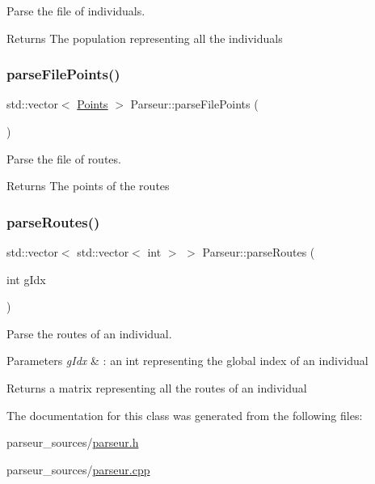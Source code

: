 Parse the file of individuals. 

\begin{DoxyReturn}{Returns}
The population representing all the individuals 
\end{DoxyReturn}
\mbox{\label{class_parseur_a67a68af11c904e1e7edd96db89517172}} 
\subsubsection{\texorpdfstring{parse\+File\+Points()}{parseFilePoints()}}
{\footnotesize\ttfamily std\+::vector$<$ \hyperlink{class_points}{Points} $>$ Parseur\+::parse\+File\+Points (\begin{DoxyParamCaption}{ }\end{DoxyParamCaption})}



Parse the file of routes. 

\begin{DoxyReturn}{Returns}
The points of the routes 
\end{DoxyReturn}
\mbox{\label{class_parseur_adc549ca4704a806fd3837091845fc24a}} 
\subsubsection{\texorpdfstring{parse\+Routes()}{parseRoutes()}}
{\footnotesize\ttfamily std\+::vector$<$ std\+::vector$<$ int $>$ $>$ Parseur\+::parse\+Routes (\begin{DoxyParamCaption}\item[{int}]{g\+Idx }\end{DoxyParamCaption})}



Parse the routes of an individual. 


\begin{DoxyParams}{Parameters}
{\em g\+Idx} & \+: an int representing the global index of an individual \\
\hline
\end{DoxyParams}
\begin{DoxyReturn}{Returns}
a matrix representing all the routes of an individual 
\end{DoxyReturn}


The documentation for this class was generated from the following files\+:\begin{DoxyCompactItemize}
\item 
parseur\+\_\+sources/\hyperlink{parseur_8h}{parseur.\+h}\item 
parseur\+\_\+sources/\hyperlink{parseur_8cpp}{parseur.\+cpp}\end{DoxyCompactItemize}
